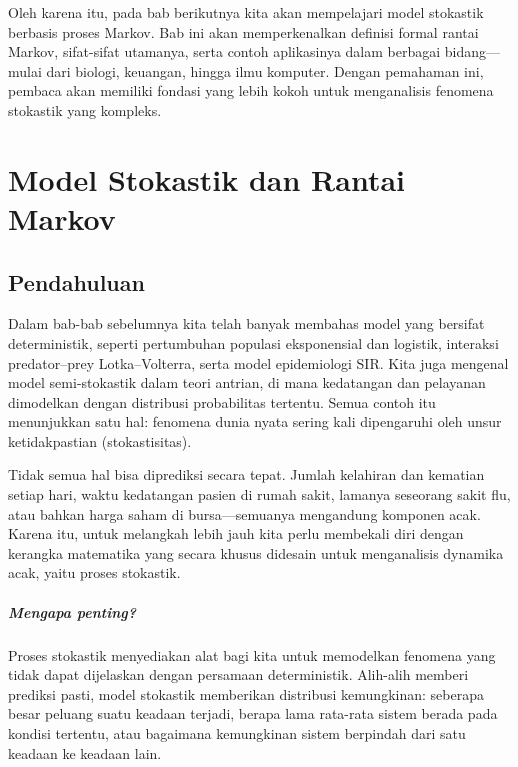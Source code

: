\documentclass{bukumjh}
\begin{document}
Oleh karena itu, pada bab berikutnya kita akan mempelajari {\jsg model stokastik berbasis proses Markov}. Bab ini akan memperkenalkan definisi formal rantai Markov, sifat-sifat utamanya, serta contoh aplikasinya dalam berbagai bidang—mulai dari biologi, keuangan, hingga ilmu komputer. Dengan pemahaman ini, pembaca akan memiliki fondasi yang lebih kokoh untuk menganalisis fenomena stokastik yang kompleks.


\chapter{Model Stokastik dan Rantai Markov}

\section{Pendahuluan}

Dalam bab-bab sebelumnya kita telah banyak membahas model yang bersifat deterministik, seperti pertumbuhan populasi eksponensial dan logistik, interaksi predator–prey Lotka–Volterra, serta model epidemiologi SIR. Kita juga mengenal model semi-stokastik dalam teori antrian, di mana kedatangan dan pelayanan dimodelkan dengan distribusi probabilitas tertentu. Semua contoh itu menunjukkan satu hal: {\jsg fenomena dunia nyata sering kali dipengaruhi oleh unsur ketidakpastian (stokastisitas)}.

Tidak semua hal bisa diprediksi secara tepat. Jumlah kelahiran dan kematian setiap hari, waktu kedatangan pasien di rumah sakit, lamanya seseorang sakit flu, atau bahkan harga saham di bursa—semuanya mengandung komponen acak. Karena itu, untuk melangkah lebih jauh kita perlu membekali diri dengan kerangka matematika yang secara khusus didesain untuk menganalisis {\jsg dynamika acak}, yaitu {\jsg proses stokastik}.

\paragraph{Mengapa penting?}  
Proses stokastik menyediakan alat bagi kita untuk memodelkan fenomena yang tidak dapat dijelaskan dengan persamaan deterministik. Alih-alih memberi prediksi pasti, model stokastik memberikan distribusi kemungkinan: seberapa besar peluang suatu keadaan terjadi, berapa lama rata-rata sistem berada pada kondisi tertentu, atau bagaimana kemungkinan sistem berpindah dari satu keadaan ke keadaan lain.
\end{document}
